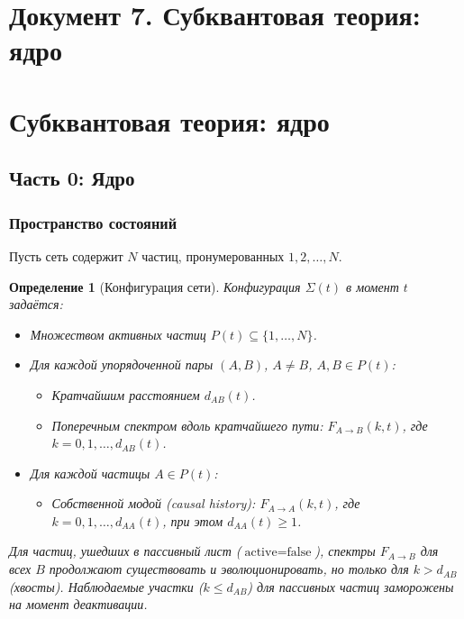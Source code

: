 \documentclass[12pt,a4paper]{article}
\newtheorem{definition}{Определение}[section]
\begin{document}
\newpage
\section*{Документ 7. Субквантовая теория: ядро}

\section{Субквантовая теория: ядро}

\subsection{Часть 0: Ядро}

\subsubsection{Пространство состояний}

Пусть сеть содержит $N$ частиц, пронумерованных $1, 2, \dots, N$.

\begin{definition}[Конфигурация сети]
Конфигурация $\Sigma(t)$ в момент $t$ задаётся:
\begin{itemize}
    \item Множеством активных частиц $P(t) \subseteq \{1, \dots, N\}$.
    \item Для каждой упорядоченной пары $(A, B)$, $A \neq B$, $A, B \in P(t)$:
    \begin{itemize}
        \item Кратчайшим расстоянием $d_{AB}(t)$.
        \item Поперечным спектром вдоль кратчайшего пути: $F_{A \to B}(k, t)$, где $k = 0, 1, \dots, d_{AB}(t)$.
    \end{itemize}
    \item Для каждой частицы $A \in P(t)$:
    \begin{itemize}
        \item Собственной модой (causal history): $F_{A \to A}(k, t)$, где $k = 0, 1, \dots, d_{AA}(t)$, при этом $d_{AA}(t) \geq 1$.
    \end{itemize}
\end{itemize}

Для частиц, ушедших в пассивный лист ($\text{active} = \text{false}$), спектры $F_{A \to B}$ для всех $B$ продолжают существовать и эволюционировать, но только для $k > d_{AB}$ (хвосты). Наблюдаемые участки ($k \leq d_{AB}$) для пассивных частиц заморожены на момент деактивации.
\end{definition}
\end{document}
